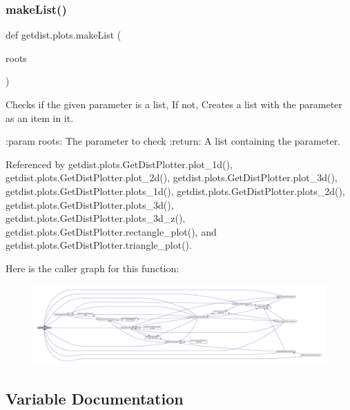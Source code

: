 \subsubsection{\texorpdfstring{make\+List()}{makeList()}}
{\footnotesize\ttfamily def getdist.\+plots.\+make\+List (\begin{DoxyParamCaption}\item[{}]{roots }\end{DoxyParamCaption})}

\begin{DoxyVerb}Checks if the given parameter is a list, If not, Creates a list with the parameter as an item in it.

:param roots: The parameter to check
:return: A list containing the parameter.
\end{DoxyVerb}
 

Referenced by getdist.\+plots.\+Get\+Dist\+Plotter.\+plot\+\_\+1d(), getdist.\+plots.\+Get\+Dist\+Plotter.\+plot\+\_\+2d(), getdist.\+plots.\+Get\+Dist\+Plotter.\+plot\+\_\+3d(), getdist.\+plots.\+Get\+Dist\+Plotter.\+plots\+\_\+1d(), getdist.\+plots.\+Get\+Dist\+Plotter.\+plots\+\_\+2d(), getdist.\+plots.\+Get\+Dist\+Plotter.\+plots\+\_\+3d(), getdist.\+plots.\+Get\+Dist\+Plotter.\+plots\+\_\+3d\+\_\+z(), getdist.\+plots.\+Get\+Dist\+Plotter.\+rectangle\+\_\+plot(), and getdist.\+plots.\+Get\+Dist\+Plotter.\+triangle\+\_\+plot().

Here is the caller graph for this function\+:
\nopagebreak
\begin{figure}[H]
\begin{center}
\leavevmode
\includegraphics[width=350pt]{namespacegetdist_1_1plots_a4baafa26a8f5db6c9860985644f8fefe_icgraph}
\end{center}
\end{figure}


\subsection{Variable Documentation}
\mbox{\label{namespacegetdist_1_1plots_a39c9b9a44ac4dde2f52838515ee8cbe5}} 
